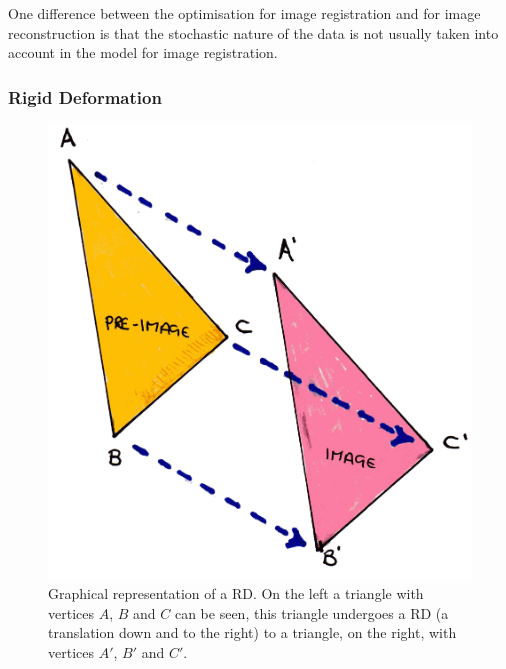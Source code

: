             One difference between the optimisation for image registration and for image reconstruction is that the stochastic nature of the data is not usually taken into account in the model for image registration.
            
            \subsubsection{Rigid Deformation} \label{sec:rigid_deformation}
                \begin{figure}
                    \centering
                    
                    \includegraphics[width=1.0\linewidth]{figures/background_rd.png}
                    
                    \captionsetup{singlelinecheck=false, justification=raggedright}
                    \caption{Graphical representation of a \gls{RD}. On the left a triangle with vertices $A$, $B$ and $C$ can be seen, this triangle undergoes a \gls{RD} (a translation down and to the right) to a triangle, on the right, with vertices $A'$, $B'$ and $C'$.} \label{fig:rigid_transformations_rd}
                \end{figure}
                
